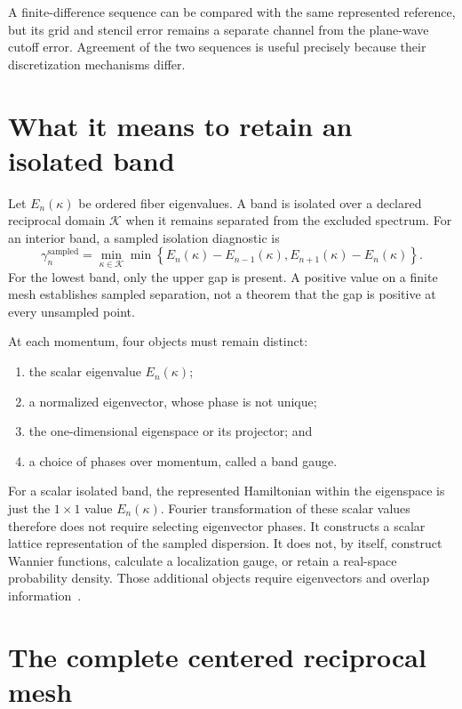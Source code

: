 A finite-difference sequence can be compared with the same represented
reference, but its grid and stencil error remains a separate channel from the
plane-wave cutoff error. Agreement of the two sequences is useful precisely
because their discretization mechanisms differ.

\section{What it means to retain an isolated band}

Let $E_n(\kappa)$ be ordered fiber eigenvalues. A band is isolated over a
declared reciprocal domain $\mathcal K$ when it remains separated from the
excluded spectrum. For an interior band, a sampled isolation diagnostic is
\begin{equation}
  \gamma_n^{\mathrm{sampled}}
  =\min_{\kappa\in\mathcal K}
   \min\left\{
     E_n(\kappa)-E_{n-1}(\kappa),
     E_{n+1}(\kappa)-E_n(\kappa)
   \right\}.
  \label{eq:training-isolated-sampled-gap}
\end{equation}
For the lowest band, only the upper gap is present.
A positive value on a finite mesh establishes sampled separation, not a theorem
that the gap is positive at every unsampled point.

At each momentum, four objects must remain distinct:
\begin{enumerate}
  \item the scalar eigenvalue $E_n(\kappa)$;
  \item a normalized eigenvector, whose phase is not unique;
  \item the one-dimensional eigenspace or its projector; and
  \item a choice of phases over momentum, called a band gauge.
\end{enumerate}
For a scalar isolated band, the represented Hamiltonian within the eigenspace is
just the $1\times1$ value $E_n(\kappa)$. Fourier transformation of these scalar
values therefore does not require selecting eigenvector phases. It constructs a
scalar lattice representation of the sampled dispersion. It does not, by
itself, construct Wannier functions, calculate a localization gauge, or retain
a real-space probability density. Those additional objects require eigenvectors
and overlap information~\cite{kohn1959,marzari2012}.

\section{The complete centered reciprocal mesh}

